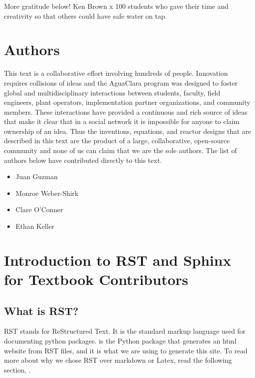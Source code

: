 \documentclass[letterpaper,10pt,english]{sphinxmanual}
\begin{document}
More gratitude below!
Ken Brown
x 100 students who gave their time and creativity so that others could have safe water on tap.


\chapter{Authors}
\label{\detokenize{Authors:authors}}\label{\detokenize{Authors:title-authors}}\label{\detokenize{Authors::doc}}
This text is a collaborative effort involving hundreds of people. Innovation requires collisions of ideas and the AguaClara program was designed to foster global and multidisciplinary interactions between students, faculty, field engineers, plant operators, implementation partner organizations, and community members. These interactions have provided a continuous and rich source of ideas that make it clear that in a social network it is impossible for anyone to claim ownership of an idea. Thus the inventions, equations, and reactor designs that are described in this text are the product of a large, collaborative, open-source community and none of us can claim that we are the sole authors. The list of authors below have contributed directly to this text.
\begin{itemize}
\item {} 
Juan Guzman

\item {} 
Monroe Weber-Shirk

\item {} 
Clare O’Conner

\item {} 
Ethan Keller

\end{itemize}


\chapter{Introduction to RST and Sphinx for Textbook Contributors}
\label{\detokenize{Textbook_Creation_Help/rst_intro:introduction-to-rst-and-sphinx-for-textbook-contributors}}\label{\detokenize{Textbook_Creation_Help/rst_intro:title-rst-intro}}\label{\detokenize{Textbook_Creation_Help/rst_intro::doc}}

\section{What is RST?}
\label{\detokenize{Textbook_Creation_Help/rst_intro:what-is-rst}}\label{\detokenize{Textbook_Creation_Help/rst_intro:heading-what-is-rst}}
RST stands for ReStructured Text. It is the standard markup language used for documenting python packages.  is the Python package that generates an html website from RST files, and it is what we are using to generate this site. To read more about why we chose RST over markdown or Latex, read the following section, {\hyperref[\detokenize{Textbook_Creation_Help/rst_intro:heading-why-rst}]{}}.
\end{document}
